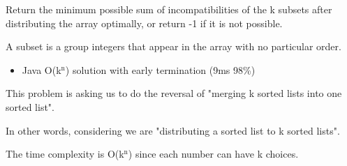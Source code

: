 \documentclass[9pt, b5paaper]{book}
\begin{document}
Return the minimum possible sum of incompatibilities of the k subsets after distributing the array optimally, or return -1 if it is not possible.

A subset is a group integers that appear in the array with no particular order.
\begin{itemize}
\item Java O(k$^{\text{n}}$) solution with early termination (9ms 98\%)
\end{itemize}

This problem is asking us to do the reversal of "merging k sorted lists into one sorted list".

In other words, considering we are "distributing a sorted list to k sorted lists".

The time complexity is O(k$^{\text{n}}$) since each number can have k choices.
\end{document}
